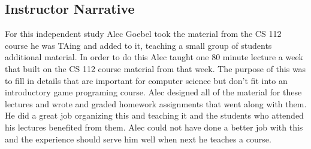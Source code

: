 
\subsection*{Instructor Narrative}
For this independent study Alec Goebel took the material from the CS
112 course he was TAing and added to it, teaching a small group of
students additional material. In order to do this Alec taught one 80
minute lecture a week that built on the CS 112 course material from that
week. The purpose of this was to fill in details that are important for
computer science but don't fit into an introductory game programing
course. Alec designed all of the material for these lectures and wrote
and graded homework assignments that went along with them. He did a
great job organizing this and teaching it and the students who attended
his lectures benefited from them. Alec could not have done a better job
with this and the experience should serve him well when next he teaches
a course.

